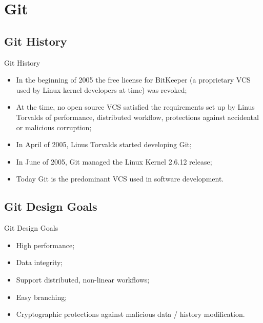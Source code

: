 \documentclass{beamer}
\begin{document}
\section{Git}

\subsection{Git History}
\begin{frame}{Git History}
  \begin{itemize}
    \item In the beginning of 2005 the free license for BitKeeper (a proprietary VCS used by Linux kernel developers at time) was revoked;
    \item At the time, no open source VCS satisfied the requirements set up by Linus Torvalds of performance, distributed workflow, protections against accidental or malicious corruption;
    \item In April of 2005, Linus Torvalds started developing Git;
    \item In June of 2005, Git managed the Linux Kernel 2.6.12 release;
    \item Today Git is the predominant VCS used in software development.
  \end{itemize}
\end{frame}

\subsection{Git Design Goals}
\begin{frame}{Git Design Goals}
  \begin{itemize}
    \item High performance;
    \item Data integrity;
    \item Support distributed, non-linear workflows;
    \item Easy branching;
    \item Cryptographic protections against malicious data / history modification.
  \end{itemize}
\end{frame}
\end{document}
